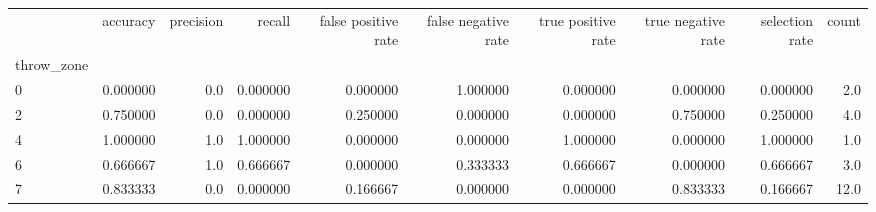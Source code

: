 \begin{tabular}{lrrrrrrrrr}
\toprule
{} &  accuracy &  precision &    recall &  false positive rate &  false negative rate &  true positive rate &  true negative rate &  selection rate &  count \\
throw\_zone &           &            &           &                      &                      &                     &                     &                 &        \\
\midrule
0          &  0.000000 &        0.0 &  0.000000 &             0.000000 &             1.000000 &            0.000000 &            0.000000 &        0.000000 &    2.0 \\
2          &  0.750000 &        0.0 &  0.000000 &             0.250000 &             0.000000 &            0.000000 &            0.750000 &        0.250000 &    4.0 \\
4          &  1.000000 &        1.0 &  1.000000 &             0.000000 &             0.000000 &            1.000000 &            0.000000 &        1.000000 &    1.0 \\
6          &  0.666667 &        1.0 &  0.666667 &             0.000000 &             0.333333 &            0.666667 &            0.000000 &        0.666667 &    3.0 \\
7          &  0.833333 &        0.0 &  0.000000 &             0.166667 &             0.000000 &            0.000000 &            0.833333 &        0.166667 &   12.0 \\
\bottomrule
\end{tabular}
